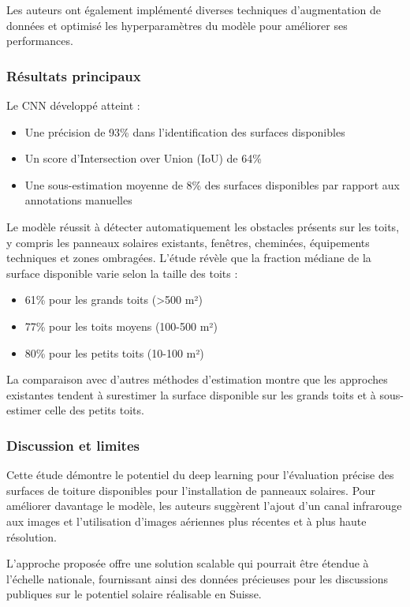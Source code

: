 {{{{\par{Les auteurs ont également implémenté diverses techniques d'augmentation de données et optimisé les hyperparamètres du modèle pour améliorer ses performances.}

\subsubsection{Résultats principaux}
Le CNN développé atteint :
\begin{itemize}
    \item Une précision de 93\% dans l'identification des surfaces disponibles
    \item Un score d'Intersection over Union (IoU) de 64\%
    \item Une sous-estimation moyenne de 8\% des surfaces disponibles par rapport aux annotations manuelles
\end{itemize}

\par{Le modèle réussit à détecter automatiquement les obstacles présents sur les toits, y compris les panneaux solaires existants, fenêtres, cheminées, équipements techniques et zones ombragées. L'étude révèle que la fraction médiane de la surface disponible varie selon la taille des toits :}
\begin{itemize}
    \item 61\% pour les grands toits (>500 m²)
    \item 77\% pour les toits moyens (100-500 m²)
    \item 80\% pour les petits toits (10-100 m²)
\end{itemize}

\par{La comparaison avec d'autres méthodes d'estimation montre que les approches existantes tendent à surestimer la surface disponible sur les grands toits et à sous-estimer celle des petits toits.}

\subsubsection{Discussion et limites}
\par{Cette étude démontre le potentiel du deep learning pour l'évaluation précise des surfaces de toiture disponibles pour l'installation de panneaux solaires. Pour améliorer davantage le modèle, les auteurs suggèrent l'ajout d'un canal infrarouge aux images et l'utilisation d'images aériennes plus récentes et à plus haute résolution.}
\par{L'approche proposée offre une solution scalable qui pourrait être étendue à l'échelle nationale, fournissant ainsi des données précieuses pour les discussions publiques sur le potentiel solaire réalisable en Suisse.}
}}}}
